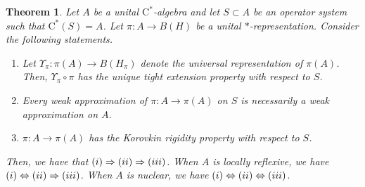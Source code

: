 \documentclass[10pt]{amsart}
\newcommand{\rC}{\mathrm{C}}
\newtheorem{theorem}[lemma]{Theorem}
\theoremstyle{definition}
\begin{document}
\begin{theorem}\label{T:locref}
Let $A$ be a unital $\rC^*$-algebra and let $S\subset A$ be an operator system such that $\rC^*(S) = A$.  Let $\pi:A\to B(H)$ be a unital $*$-representation. Consider the following statements.
\begin{enumerate}[{\rm (i)}]
\item Let $\Upsilon_\pi:\pi(A)\to B(H_\pi)$ denote the universal representation of $\pi(A)$. Then, $\Upsilon_\pi\circ \pi$ has the unique tight extension property with respect to $S$.
\item Every weak approximation of $\pi:A\to \pi(A)$ on $S$ is necessarily a weak approximation on $A$.
\item $\pi:A\to \pi(A)$ has the Korovkin rigidity property with respect to $S$.
\end{enumerate}
Then, we have that ${\rm (i)}\Rightarrow {\rm (ii)}\Rightarrow {\rm (iii)}$. When $A$ is locally reflexive, we have ${\rm (i)}\Leftrightarrow {\rm (ii)}\Rightarrow {\rm (iii)}$. When $A$ is nuclear, we have ${\rm (i)}\Leftrightarrow {\rm (ii)}\Leftrightarrow {\rm (iii)}$.
\end{theorem}
\end{document}
